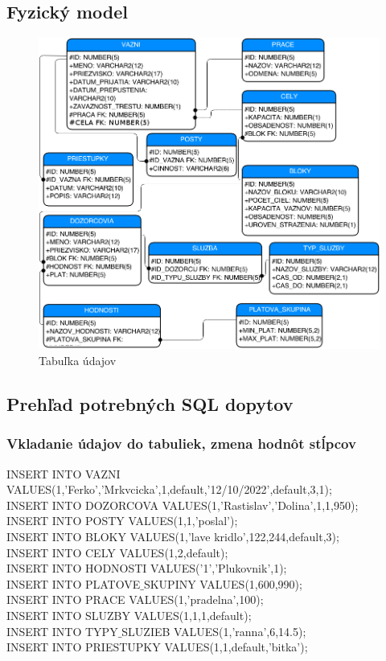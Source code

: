 \documentclass[slovak, 12pt, Times New Roman]{article}
\begin{document}
		\subsection{Fyzický model}
		\begin{figure}[!htb]
				\centering
				\includegraphics[scale=0.6]{fyzDia.png}
				\caption{Tabuľka údajov}
				\label{fig:Reinforcement}
			\end{figure}
		\clearpage
		\subsection{Prehľad potrebných SQL dopytov}
			\subsubsection{Vkladanie údajov do tabuliek, zmena hodnôt stĺpcov}
				INSERT INTO VAZNI VALUES(1,'Ferko','Mrkvcicka',1,default,'12/10/2022',default,3,1);\\
				INSERT INTO DOZORCOVA VALUES(1,'Rastislav','Dolina',1,1,950);\\
				INSERT INTO POSTY VALUES(1,1,'poslal');\\
				INSERT INTO BLOKY VALUES(1,'lave kridlo',122,244,default,3);\\
				INSERT INTO CELY VALUES(1,2,default);\\
				INSERT INTO HODNOSTI VALUES('1','Plukovnik',1);\\
				INSERT INTO PLATOVE$\_$SKUPINY VALUES(1,600,990);\\
				INSERT INTO PRACE VALUES(1,'pradelna',100);\\
				INSERT INTO SLUZBY VALUES(1,1,1,default);\\
				INSERT INTO TYPY$\_$SLUZIEB VALUES(1,'ranna',6,14.5);\\
				INSERT INTO PRIESTUPKY VALUES(1,1,default,'bitka');\\
\end{document}
